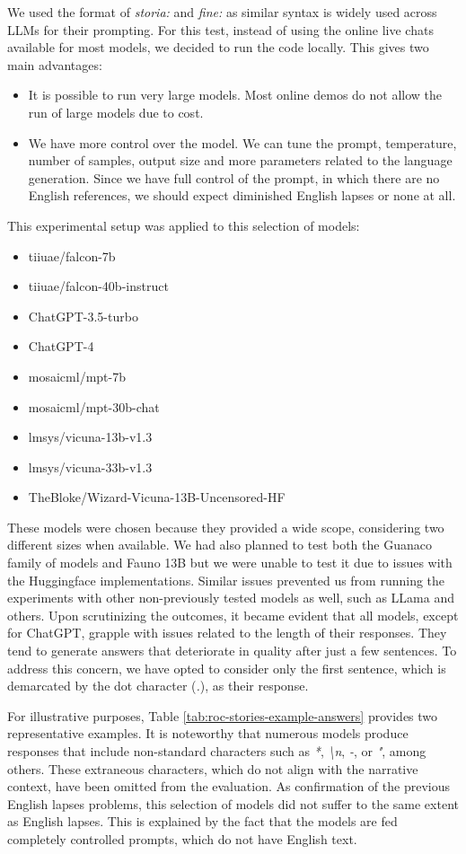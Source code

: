 We used the format of \emph{storia:} and \emph{fine:} as similar syntax is widely used across LLMs for their prompting.
For this test, instead of using the online live chats available for most models, we decided to run the code locally. This gives two main advantages:
\begin{itemize}
    \item It is possible to run very large models. Most online demos do not allow the run of large models due to cost.
    \item We have more control over the model. We can tune the prompt, temperature, number of samples, output size and more parameters related to the language generation. Since we have full control of the prompt, in which there are no English references, we should expect diminished English lapses or none at all.
\end{itemize}
This experimental setup was applied to this selection of models:
\begin{itemize}
    \item   tiiuae/falcon-7b
    \item   tiiuae/falcon-40b-instruct
    \item   ChatGPT-3.5-turbo
    \item   ChatGPT-4
    \item   mosaicml/mpt-7b
    \item   mosaicml/mpt-30b-chat
    \item   lmsys/vicuna-13b-v1.3
    \item   lmsys/vicuna-33b-v1.3
    \item   TheBloke/Wizard-Vicuna-13B-Uncensored-HF
\end{itemize}
These models were chosen because they provided a wide scope, considering two different sizes when available.  We had also planned to test both the Guanaco family of models and Fauno 13B but we were unable to test it due to issues with the Huggingface implementations. Similar issues prevented us from running the experiments with other non-previously tested models as well, such as LLama and others.
\label{cha:methodology-LLMs-selection-story-cloze-test-results}
Upon scrutinizing the outcomes, it became evident that all models, except for ChatGPT, grapple with issues related to the length of their responses. They tend to generate answers that deteriorate in quality after just a few sentences. To address this concern, we have opted to consider only the first sentence, which is demarcated by the dot character (\emph{.}), as their response.

For illustrative purposes, Table \ref{tab:roc-stories-example-answers} provides two representative examples. It is noteworthy that numerous models produce responses that include non-standard characters such as \emph{*}, \emph{\textbackslash n}, \emph{-}, or \emph{"}, among others. These extraneous characters, which do not align with the narrative context, have been omitted from the evaluation. 
As confirmation of the previous English lapses problems, this selection of models did not suffer to the same extent as English lapses. This is explained by the fact that the models are fed completely controlled prompts, which do not have English text.

